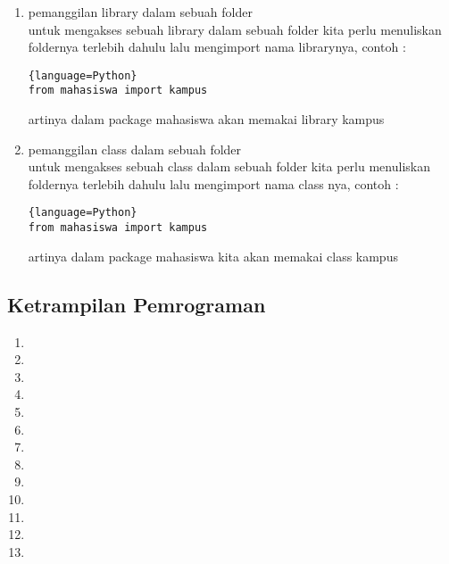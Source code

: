 \documentclass[12pt]{article}
\begin{document}
\begin{enumerate}
			\item pemanggilan library dalam sebuah folder\\
			untuk mengakses sebuah library dalam sebuah folder kita perlu menuliskan foldernya terlebih dahulu lalu mengimport nama librarynya, contoh :
			\begin{lstlisting}{language=Python}
from mahasiswa import kampus
			\end{lstlisting}
artinya dalam package mahasiswa akan memakai library kampus

			\item pemanggilan class dalam sebuah folder\\
			untuk mengakses sebuah class dalam sebuah folder kita perlu menuliskan foldernya terlebih dahulu lalu mengimport nama class nya, contoh :
			\begin{lstlisting}{language=Python}
from mahasiswa import kampus
			\end{lstlisting}
artinya dalam package mahasiswa kita akan memakai class kampus
			
			\end{enumerate}
			
	\subsection{Ketrampilan Pemrograman}
			\begin{enumerate}
				\item 
				\item 
				\item 
				\item 
				\item 
				\item 
				\item 
				\item 
				\item 
				\item 
				\item 
				\item 
				\item 
	
			\end{enumerate}
\end{document}
